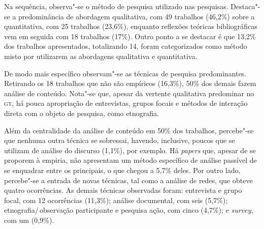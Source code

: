 Na sequência, observa"-se o método de pesquisa utilizado nas pesquisas.
Destaca"-se a predominância de abordagem qualitativa, com 49 trabalhos (46,2\%) sobre a
quantitativa, com 25 trabalhos (23,6\%), enquanto reflexões teóricas bibliográficas vem em
seguida com 18 trabalhos (17\%). Outro ponto a se destacar é que 13,2\% dos trabalhos
apresentados, totalizando 14, foram categorizados como método misto por utilizarem as
abordagens qualitativa e quantitativa.

De modo mais específico observam"-se as técnicas de pesquisa
predominantes. Retirando os 18 trabalhos que não são empíricos (16,3\%),
50\% dos demais fazem análise de conteúdo. Nota"-se que, apesar da
vertente qualitativa predominar no \textsc{gt}, há pouca apropriação de
entrevistas, grupos focais e métodos de interação direta com o objeto de
pesquisa, como etnografia.

Além da centralidade da análise de conteúdo em 50\% dos trabalhos,
percebe"-se que nenhuma outra técnica se sobressai, havendo, inclusive,
poucos que se utilizam de análise do discurso (1,1\%), por exemplo. Há
\textit{papers} que, apesar de se proporem à empiria, não apresentam um
método específico de análise passível de se enquadrar entre os
principais, o que chegou a 5,7\% deles. Por outro lado, percebe"-se a
entrada de novas técnicas, tal como a análise de redes, que obteve
quatro ocorrências. As demais técnicas observadas foram: entrevista e grupo focal, com 12 ocorrências (11,3\%); análise documental, com seis (5,7\%); etnografia/\,observação
participante e pesquisa ação, com cinco (4,7\%); e \textit{survey}, com um (0,9\%).

